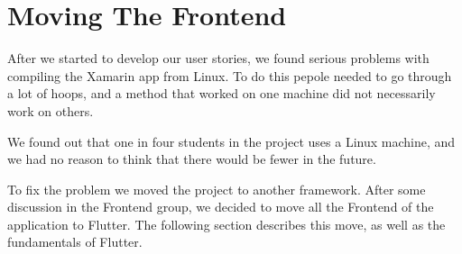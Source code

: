 \section{Moving The Frontend}

After we started to develop our user stories, we found serious problems with compiling the Xamarin app from Linux. To do this pepole needed to go through a lot of hoops, and a method that worked on one machine did not necessarily work on others.

We found out that one in four students in the project uses a Linux machine, and we had no reason to think that there would be fewer in the future.

To fix the problem we moved the project to another framework. After some discussion in the Frontend group, we decided to move all the Frontend of the application to Flutter. The following section describes this move, as well as the fundamentals of Flutter. 
